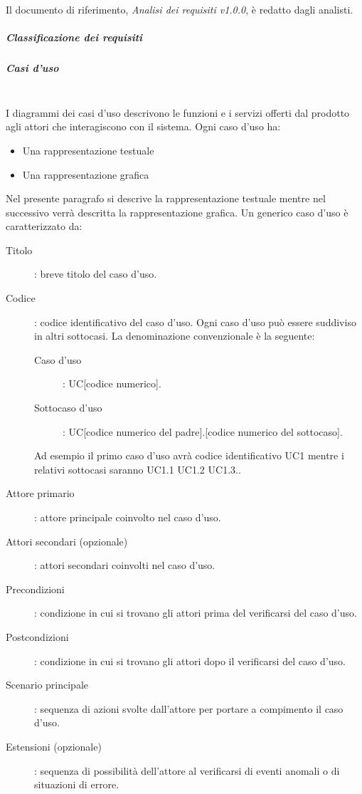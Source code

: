\documentclass[../norme-di-progetto.tex]{subfiles}
\begin{document}
Il documento di riferimento, \textit{Analisi dei requisiti v1.0.0}, è redatto dagli analisti.

\subparagraph{Classificazione dei requisiti}%
\label{subp:classificazione dei requisiti}

\subparagraph{Casi d'uso}%
\label{subp:casi d'uso}
\\ I diagrammi dei casi d'uso descrivono le funzioni e i servizi offerti dal prodotto agli attori che interagiscono con il sistema. Ogni caso d'uso ha:

\begin{itemize}
  \item Una rappresentazione testuale
  \item Una rappresentazione grafica
\end{itemize}

Nel presente paragrafo si descrive la rappresentazione testuale mentre nel successivo verrà descritta la rappresentazione grafica. Un generico caso d'uso è caratterizzato da:
\begin{description}
\item [Titolo]: breve titolo del caso d'uso.
\item [Codice]: codice identificativo del caso d'uso. Ogni caso d'uso può essere suddiviso in altri sottocasi. La denominazione convenzionale è la seguente:
\begin{description}
  \item [Caso d'uso]: UC[codice numerico].
    \item [Sottocaso d'uso]: UC[codice numerico del padre].[codice numerico del sottocaso].
\end{description}
Ad esempio il primo caso d'uso avrà codice identificativo UC1 mentre i relativi sottocasi saranno UC1.1 UC1.2 UC1.3..
\item [Attore primario]: attore principale coinvolto nel caso d'uso.
\item [Attori secondari (opzionale)]: attori secondari coinvolti nel caso d'uso.
\item [Precondizioni]: condizione in cui si trovano gli attori prima del verificarsi del caso d'uso.
\item [Postcondizioni]: condizione in cui si trovano gli attori dopo il verificarsi del caso d'uso.
\item [Scenario principale]: sequenza di azioni svolte dall'attore per portare a compimento il caso d'uso.
\item [Estensioni (opzionale)]: sequenza di possibilità dell'attore al verificarsi di eventi anomali o di situazioni di errore.
\end{description}
\end{document}
